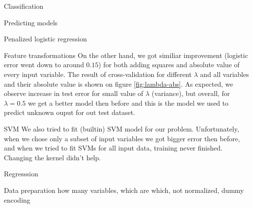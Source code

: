 \documentclass{article}
\begin{document}
\begin{section}{Classification}
\begin{subsection}{Predicting models}
\begin{subsubsection}{Penalized logistic regression}
\begin{subsubsection}{Feature transformations}
On the other hand, we got similiar improvement (logistic error went down to around $0.15$) for both adding squares and absolute value of every input variable. The result of cross-validation for different $\lambda$ and all variables and their absolute value is shown on figure \ref{fig:lambda-abs}. As expected, we observe increase in test error for small value of $\lambda$ (variance), but overall, for $\lambda = 0.5$ we get a better model then before and this is the model we used to predict unknown ouput for out test dataset.
\end{subsubsection}
\end{subsubsection}
\begin{subsubsection}{SVM}
We also tried to fit (builtin) SVM model for our problem. Unfortunately, when we chose only a subset of input variables we got bigger error then before, and when we tried to fit SVMs for all input data, training never finished. Changing the kernel didn't help.
\end{subsubsection}
\end{subsection}
\end{section}
\begin{section}{Regresssion}
\begin{subsection}{Data preparation}
how many variables, which are which, not normalized, dummy encoding
\begin{figure}[!h]
\center
{}
\hfill
{}
\caption{}
\end{figure}
\end{subsection}
\end{section}
\end{document}
